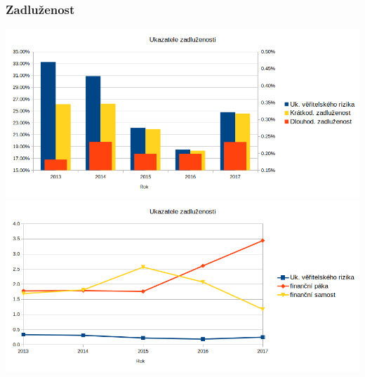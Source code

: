 \documentclass[12pt]{article}%
\begin{document}
\subsubsection*{Zadluženost}
\includegraphics[scale=0.6]{obr/ukazatele_zadlzenosti1.png} \\
\includegraphics[scale=0.6]{obr/ukazatele_zadlzenosti.png}
\end{document}
